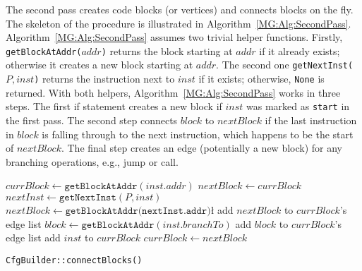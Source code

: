The second pass creates code blocks (or vertices) and connects blocks on the fly.
The skeleton of the procedure is illustrated in Algorithm~\ref{MG:Alg:SecondPass}.
Algorithm~\ref{MG:Alg:SecondPass} assumes two trivial helper functions.
Firstly, \texttt{getBlockAtAddr($addr$)} returns the block starting at $addr$
if it already exists; otherwise it creates a new block starting at $addr$.
The second one \texttt{getNextInst($P, inst$)} returns the instruction next to $inst$ if it exists; otherwise, \texttt{None} is returned.
With both helpers, Algorithm~\ref{MG:Alg:SecondPass} works in three steps.
The first if statement creates a new block if $inst$ was marked as \texttt{start} in the first pass.
The second step connects $block$ to $nextBlock$ if the last instruction in $block$ is falling through to the next instruction, which happens to be the start of $nextBlock$.
The final step creates an edge (potentially a new block) for any branching operations, e.g., jump or call.

\begin{algorithm}[t]
    \DontPrintSemicolon
     {
         {
            $currBlock \gets \texttt{getBlockAtAddr}(inst.addr)$\;
        }
        $nextBlock \gets currBlock$\;
        $nextInst \gets \texttt{getNextInst}(P, inst)$\;
         {
             {
                $nextBlock \gets \texttt{getBlockAtAddr(nextInst.addr)}$\l\;
                add $nextBlock$ to $currBlock$'s edge list\;
            }
        }
         {
            $block \gets \texttt{getBlockAtAddr}(inst.branchTo)$\;
            add $block$ to $currBlock$'s edge list\;
        }
        add $inst$ to $currBlock$\;
        $currBlock \gets nextBlock$\;
    }
    \caption{\texttt{CfgBuilder::connectBlocks()}}
    \label{MG:Alg:SecondPass}
\end{algorithm}

